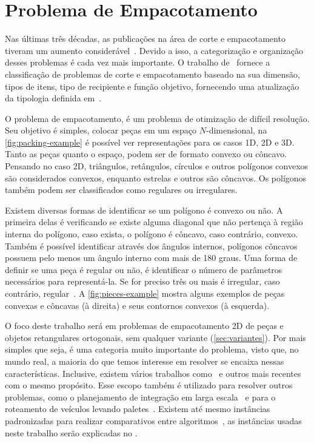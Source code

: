 \chapter{Problema de Empacotamento}\label{ch:problema-de-empacotamento}

Nas últimas três décadas, as publicações na área de corte e empacotamento tiveram um aumento
considerável~\cite{exact-solution-techniques,wascher2007improved}.
Devido a isso, a categorização e organização desses problemas é cada vez mais importante.
O trabalho de~\cite{wascher2007improved} fornece a classificação de problemas de corte e
empacotamento baseado na sua dimensão, tipos de itens, tipo de recipiente e função objetivo,
fornecendo uma atualização da tipologia definida em~\cite{dyckhoff1990typology}.

O problema de empacotamento, é um problema de otimização de difícil resolução.
Seu objetivo é simples, colocar peças em um espaço $N$-dimensional, na \autoref{fig:packing-example}
é possível ver representações para os casos 1D, 2D e 3D\@.
Tanto as peças quanto o espaço, podem ser de formato convexo ou côncavo.
Pensando no caso 2D, triângulos, retângulos, círculos e outros polígonos convexos são
considerados convexos, enquanto estrelas e outros são côncavos.
Os polígonos também podem ser classificados como regulares ou irregulares.



Existem diversas formas de identificar se um polígono é convexo ou não.
A primeira delas é verificando se existe alguma diagonal que não pertença à região interna do
polígono, caso exista, o polígono é côncavo, caso contrário, convexo.
Também é possível identificar através dos ângulos internos, polígonos côncavos possuem pelo menos
um ângulo interno com mais de 180 graus.
Uma forma de definir se uma peça é regular ou não, é identificar o número de parâmetros
necessários para representá-la.
Se for preciso três ou mais é irregular, caso contrário, regular~\cite{aprendizado-reforco}.
A \autoref{fig:pieces-example} mostra alguns exemplos de peças convexas e côncavas (à direita)
e seus contornos convexos (à esquerda).



O foco deste trabalho será em problemas de empacotamento 2D de peças e objetos retangulares
ortogonais, sem qualquer variante (\autoref{sec:variantes}).
Por mais simples que seja, é uma categoria muito importante do problema, visto que, no mundo real,
a maioria do que temos interesse em resolver se encaixa nessas características.
Inclusive, existem vários trabalhos como~\cite{wei2011skyline} e outros mais recentes~\cite{
    martin2020models,firat2020effective,chen2019efficient} com o mesmo propósito.
Esse escopo também é utilizado para resolver outros problemas, como o planejamento de integração em
larga escala~\cite{huang2007efficient} e para o roteamento de veículos levando paletes~\cite{
    silva2022integer}.
Existem até mesmo instâncias padronizadas para realizar comparativos entre algoritmos~\cite{
    2DPackLib}, as instâncias usadas neste trabalho serão explicadas no .

